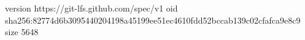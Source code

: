 version https://git-lfs.github.com/spec/v1
oid sha256:82774d6b3095440204198a45199ee51ec4610fdd52bccab139c02cfafca9e8c9
size 5648
